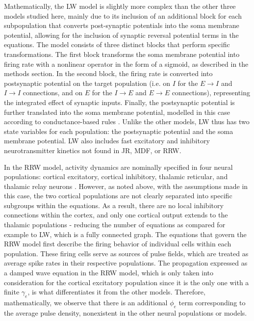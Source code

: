 \documentclass[12pt,twoside]{article}
\begin{document}
Mathematically, the LW model is slightly more complex than the other three models studied here, mainly due to its inclusion of an additional block for each subpopulation that converts post-synaptic potentials into the soma membrane potential, allowing for the inclusion of synaptic reversal potential terms in the equations. The model consists of three distinct blocks that perform specific transformations. The first block transforms the soma membrane potential into firing rate with a nonlinear operator in the form of a sigmoid, as described in the methods section. In the second block, the firing rate is converted into postsynaptic potential on the target population (i.e. on $I$ for the $E \rightarrow I$ and  $I \rightarrow I$ connections, and on $E$ for the $I \rightarrow E$ and $E \rightarrow E$ connections), representing the integrated effect of synaptic inputs. Finally, the postsynaptic potential is further translated into the soma membrane potential, modelled in this case according to conductance-based rules \citep{song2019novel}. Unlike the other models, LW thus has two state variables for each population: the postsynaptic potential and the soma membrane potential. LW also includes fast excitatory and inhibitory neurotransmitter kinetics not found in JR, MDF, or RRW. 

In the RRW model, activity dynamics are nominally specified in four neural populations: cortical excitatory, cortical inhibitory, thalamic reticular, and thalamic relay neurons \citep{robinson2002dynamics}. However, as noted above, with the assumptions made in this case, the two cortical populations are not clearly separated into specific subgroups within the equations. As a result, there are no local inhibitory connections within the cortex, and only one cortical output extends to the thalamic populations - reducing the number of equations as compared for example to LW, which is a fully connected graph. The equations that govern the RRW model first describe the firing behavior of individual cells within each population. These firing cells serve as sources of pulse fields, which are treated as average spike rates in their respective populations. The propagation expressed as a damped wave equation in the RRW model, which is only taken into consideration for the cortical excitatory population since it is the only one with a finite $\gamma_e$, is what differentiates it from the other models. Therefore, mathematically, we observe that there is an additional $\phi_e$ term corresponding to the average pulse density, nonexistent in the other neural populations or models. 
\end{document}
